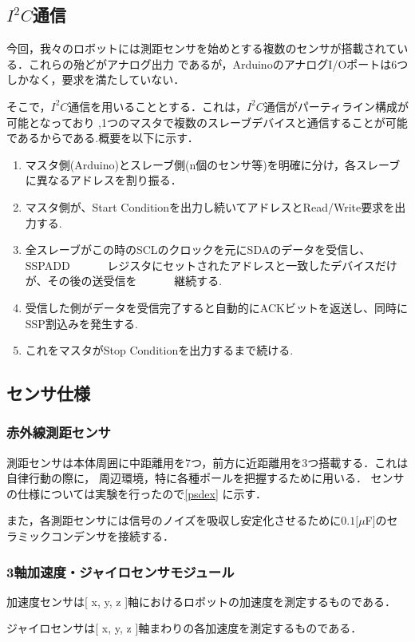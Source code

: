 \documentclass[10pt,a4j]{jarticle}
\begin{document}
\subsection{$I^2 C$通信}
今回，我々のロボットには測距センサを始めとする複数のセンサが搭載されている．これらの殆どがアナログ出力
であるが，ArduinoのアナログI/Oポートは6つしかなく，要求を満たしていない．

そこで，$I^2 C$通信を用いることとする．これは，$I^2 C$通信がパーティライン構成が可能となっており
,1つのマスタで複数のスレーブデバイスと通信することが可能であるからである.概要を以下に示す．
\begin{enumerate}
 \item マスタ側(Arduino)とスレーブ側(n個のセンサ等)を明確に分け，各スレーブに異なるアドレスを割り振る．
 \item マスタ側が、Start Conditionを出力し続いてアドレスとRead/Write要求を出力する.
 \item 全スレーブがこの時のSCLのクロックを元にSDAのデータを受信し、SSPADD
　　　レジスタにセットされたアドレスと一致したデバイスだけが、その後の送受信を
　　　継続する.
 \item 受信した側がデータを受信完了すると自動的にACKビットを返送し、同時にSSP割込みを発生する.
 \item これをマスタがStop Conditionを出力するまで続ける.
\end{enumerate}

\subsection{センサ仕様}
\subsubsection{赤外線測距センサ}  
測距センサは本体周囲に中距離用を7つ，前方に近距離用を3つ搭載する．これは自律行動の際に，
周辺環境，特に各種ポールを把握するために用いる． センサの仕様については実験を行ったので\ref{psdex}
 に示す．

また，各測距センサには信号のノイズを吸収し安定化させるために$0.1[\mu $F]のセラミックコンデンサを接続する．

\subsubsection{3軸加速度・ジャイロセンサモジュール}
加速度センサは[ x, y, z ]軸におけるロボットの加速度を測定するものである．

ジャイロセンサは[ x, y, z ]軸まわりの各加速度を測定するものである．
\end{document}
